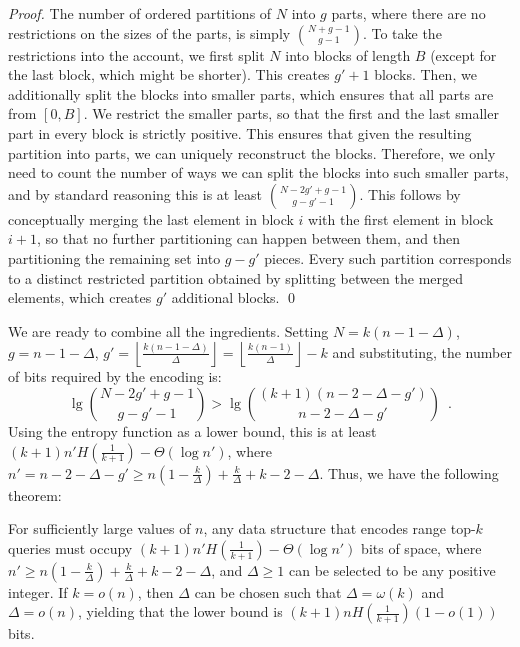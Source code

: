 \documentclass[runningheads]{llncs}
\begin{document}
\begin{proof}
The number of ordered partitions of $N$ into $g$ parts, where there
are no restrictions on the sizes of the parts, is simply
$\binom{N+g-1}{g-1}$. To take the restrictions into the account, we
first split $N$ into blocks of length $B$ (except for the last block,
which might be shorter). This creates $g'+1$ blocks. Then, we
additionally split the blocks into smaller parts, which ensures that
all parts are from $[0,B]$. We restrict the smaller parts, so that the
first and the last smaller part in every block is strictly positive.
This ensures that given the resulting partition into parts, we can uniquely
reconstruct the blocks. Therefore, we only need to count the number of
ways we can split the blocks into such smaller parts, and by standard
reasoning this is at least $\binom{N-2g'+g-1}{g-g'-1}$.  This follows
by conceptually merging the last element in block $i$ with the first
element in block $i+1$, so that no further partitioning can happen
between them, and then partitioning the remaining set into $g-g'$
pieces. Every such partition corresponds to a distinct restricted
partition obtained by splitting between the merged elements, which creates
$g'$ additional blocks. 
\qed
\end{proof}



We are ready to combine all the ingredients. Setting
$N=k(n-1-\Delta)$, $g=n-1-\Delta$,
$g'=\left\lfloor\frac{k(n-1-\Delta)}{\Delta}\right\rfloor=\left\lfloor\frac{k(n-1)}{\Delta}\right\rfloor-k$
and substituting, the number of bits required by the encoding is:
$$ \lg \binom{N-2g'+g-1}{g-g'-1} > \lg \binom{(k+1)(n-2-\Delta-g')}{n-2-\Delta-g'} \enspace .$$
\noindent
Using the entropy function as a lower bound, this is at least
$(k+1)n'H(\frac{1}{k+1}) - \Theta(\log n')$, where $n' = n-2-\Delta-g'
\geq n(1-\frac{k}{\Delta})+\frac{k}{\Delta}+k - 2-\Delta$.  Thus, we
have the following theorem:

\begin{theorem}
\label{thm:top-k-lb}
For sufficiently large values of $n$, any data structure that encodes
range top-$k$ queries must occupy $(k+1)n'H(\frac{1}{k+1}) -
\Theta(\log n')$ bits of space, where $n' \ge
n(1-\frac{k}{\Delta})+\frac{k}{\Delta}+k - 2-\Delta$, and $\Delta \ge
1$ can be selected to be any positive integer.  If $k = o(n)$, then
$\Delta$ can be chosen such that $\Delta = \omega(k)$ and $\Delta =
o(n)$, yielding that the lower bound is $(k+1)n
H(\frac{1}{k+1})(1-o(1))$ bits.
\end{theorem}
\end{document}
